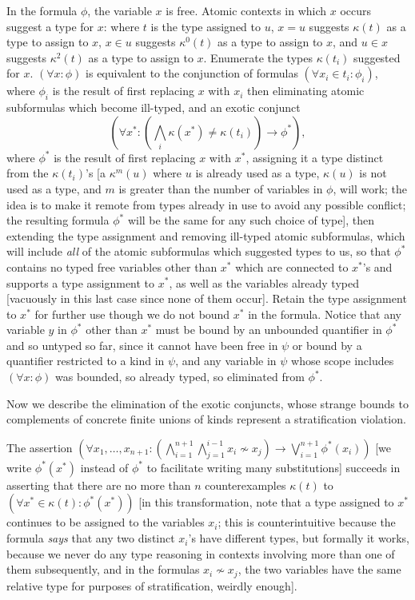\documentclass[12pt]{article}
\begin{document}
\begin{description}
In the formula $\phi$, the variable $x$ is free.  Atomic contexts in which $x$ occurs suggest a type for $x$:  where $t$ is the type assigned to $u$, $x=u$ suggests $\kappa(t)$ as a type to assign to $x$, $x \in u$ suggests $\kappa^0(t)$ as a type to assign to $x$, and $u \in x$ suggests $\kappa^2(t)$ as a type to assign to $x$.
Enumerate the types $\kappa(t_i)$ suggested for $x$.  $(\forall x:\phi)$ is equivalent to the conjunction of formulas $(\forall x_i \in t_i:\phi_i)$, where $\phi_i$ is the result of first replacing $x$ with $x_i$ then eliminating atomic subformulas
which become ill-typed, and an exotic conjunct $$(\forall x^*:(\bigwedge_i \kappa(x^*) \neq \kappa(t_i))\rightarrow \phi^*),$$ where $\phi^*$ is the result of first replacing $x$ with $x^*$, assigning it a type distinct from the $\kappa(t_i)$'s [a $\kappa^m(u)$ where $u$ is already used as a type, $\kappa(u)$ is not used as a type, and $m$ is greater than the number of variables in $\phi$, will work;  the idea is to make it remote from types already in use to avoid any possible conflict;  the resulting formula $\phi^*$ will be the same for any such choice of type], then extending the type assignment and removing ill-typed atomic subformulas, which will include  {\em all\/} of the atomic subformulas which suggested types to us, so that $\phi^*$ contains no typed free variables other than $x^*$ which are connected to $x^*$'s and supports a type assignment to $x^*$, as well as the variables already typed [vacuously in this last case since none of them occur].  Retain the type assignment to $x^*$ for further use though we do not bound $x^*$ in the formula.  Notice that any variable $y$ in $\phi^*$ other than $x^*$ must be bound by an unbounded quantifier in $\phi^*$ and so untyped so far, since it  cannot have been free in $\psi$ or bound by a quantifier restricted to a kind in $\psi$, and any variable in $\psi$ whose scope includes $(\forall x:\phi)$ was bounded, so already typed, so eliminated from $\phi^*$.

Now we describe the elimination of the exotic conjuncts, whose strange bounds to complements of concrete finite unions of kinds represent a stratification violation.   

The assertion $(\forall x_1,\ldots,x_{n+1}: (\bigwedge_{i=1}^{n+1} \bigwedge_{j=1}^{i-1} x_i \not\sim x_j) \rightarrow \bigvee_{i=1}^{n+1}\phi^*(x_i))$  [we write $\phi^*(x^*)$ instead of $\phi^*$ to facilitate writing many substitutions] succeeds in asserting that there are no more than $n$ counterexamples $\kappa(t)$ to $(\forall x^* \in \kappa(t):\phi^*(x^*))$ [in this transformation, note that a type assigned to $x^*$ continues to be assigned to the variables $x_i$; this is counterintuitive because the formula {\em says\/} that any  two distinct $x_i$'s have different types, but formally it works, because we never do any type reasoning in contexts involving more than one of them subsequently, and in the formulas $x_i \not\sim x_j$, the two variables have the same relative type for purposes of stratification, weirdly enough].


\end{description}
\end{document}
